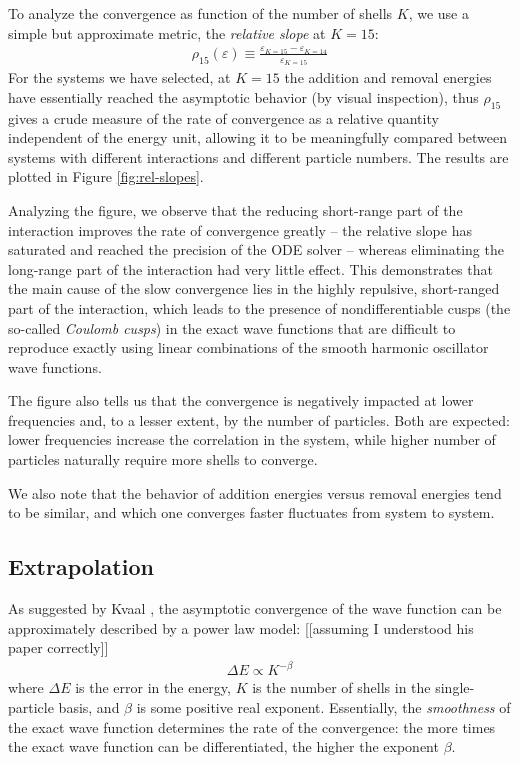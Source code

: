 To analyze the convergence as function of the number of shells $K$, we use a simple but approximate metric, the \textit{relative slope} at $K = 15$:
\begin{align*}
  \rho_{15}(\varepsilon) \equiv \frac{\varepsilon_{K = 15} - \varepsilon_{K = 14}}{\varepsilon_{K = 15}}
\end{align*}
For the systems we have selected, at $K = 15$ the addition and removal energies have essentially reached the asymptotic behavior (by visual inspection), thus $\rho_{15}$ gives a crude measure of the rate of convergence as a relative quantity independent of the energy unit, allowing it to be meaningfully compared between systems with different interactions and different particle numbers.  The results are plotted in Figure \ref{fig:rel-slopes}.

Analyzing the figure, we observe that the reducing short-range part of the interaction improves the rate of convergence greatly -- the relative slope has saturated and reached the precision of the ODE solver -- whereas eliminating the long-range part of the interaction had very little effect.  This demonstrates that the main cause of the slow convergence lies in the highly repulsive, short-ranged part of the interaction, which leads to the presence of nondifferentiable cusps (the so-called \textit{Coulomb cusps}) in the exact wave functions that are difficult to reproduce exactly using linear combinations of the smooth harmonic oscillator wave functions.

The figure also tells us that the convergence is negatively impacted at lower frequencies and, to a lesser extent, by the number of particles.  Both are expected: lower frequencies increase the correlation in the system, while higher number of particles naturally require more shells to converge.

We also note that the behavior of addition energies versus removal energies tend to be similar, and which one converges faster fluctuates from system to system.

\subsection{Extrapolation}
\label{subsec:extrapolation}

As suggested by Kvaal \cite{PhysRevB.80.045321,Kvaal2007}, the asymptotic convergence of the wave function can be approximately described by a power law model: [[assuming I understood his paper correctly]]
\begin{align*}
  \Delta E \propto K^{-\beta}
\end{align*}
where $\Delta E$ is the error in the energy, $K$ is the number of shells in the single-particle basis, and $\beta$ is some positive real exponent.  Essentially, the \textit{smoothness} of the exact wave function determines the rate of the convergence: the more times the exact wave function can be differentiated, the higher the exponent $\beta$.

